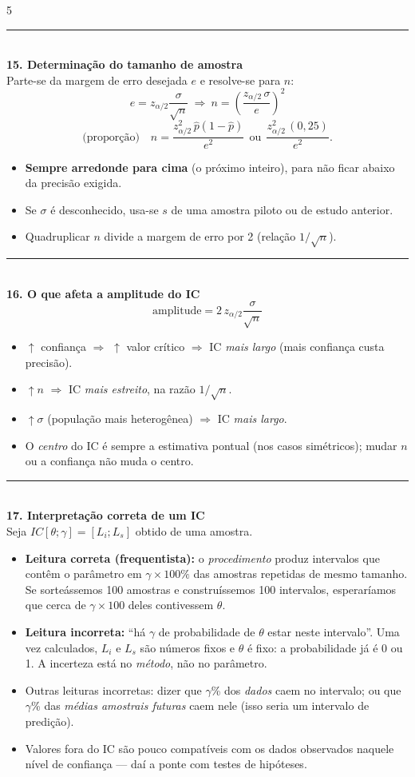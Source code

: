 \documentclass[a4paper,8pt]{extarticle}
\newcommand{\tit}[1]{\vspace{2pt}\textcolor{azul}{\rule{\linewidth}{0.6pt}}\\[1pt]\textbf{\textcolor{azul}{#1}}\\[1pt]}
\begin{document}
\begin{multicols*}{5}
\tit{15. Determinação do tamanho de amostra}
Parte-se da margem de erro desejada $e$ e resolve-se para $n$:
\[e=z_{\alpha/2}\frac{\sigma}{\sqrt n}\ \Longrightarrow\ n=\left(\frac{z_{\alpha/2}\,\sigma}{e}\right)^{2}\]
\[\text{(proporção)}\quad n=\frac{z_{\alpha/2}^2\,\hat p(1-\hat p)}{e^2}\ \ \text{ou}\ \ \frac{z_{\alpha/2}^2\,(0{,}25)}{e^2}.\]
\begin{itemize}
\item \textbf{Sempre arredonde para cima} (o próximo inteiro), para não ficar abaixo da precisão exigida.
\item Se $\sigma$ é desconhecido, usa-se $s$ de uma amostra piloto ou de estudo anterior.
\item Quadruplicar $n$ divide a margem de erro por 2 (relação $1/\sqrt n$).
\end{itemize}

\tit{16. O que afeta a amplitude do IC}
\[\text{amplitude}=2\,z_{\alpha/2}\frac{\sigma}{\sqrt n}\]
\begin{itemize}
\item $\uparrow$ confiança $\Rightarrow$ $\uparrow$ valor crítico $\Rightarrow$ IC \emph{mais largo} (mais confiança custa precisão).
\item $\uparrow n$ $\Rightarrow$ IC \emph{mais estreito}, na razão $1/\sqrt n$.
\item $\uparrow \sigma$ (população mais heterogênea) $\Rightarrow$ IC \emph{mais largo}.
\item O \emph{centro} do IC é sempre a estimativa pontual (nos casos simétricos); mudar $n$ ou a confiança não muda o centro.
\end{itemize}

\tit{17. Interpretação correta de um IC}
Seja $IC[\theta;\gamma]=[L_i;L_s]$ obtido de uma amostra.
\begin{itemize}
\item \textbf{Leitura correta (frequentista):} o \emph{procedimento} produz intervalos que contêm o parâmetro em $\gamma\times100\%$ das amostras repetidas de mesmo tamanho. Se sorteássemos 100 amostras e construíssemos 100 intervalos, esperaríamos que cerca de $\gamma\times100$ deles contivessem $\theta$.
\item \textbf{Leitura incorreta:} “há $\gamma$ de probabilidade de $\theta$ estar neste intervalo”. Uma vez calculados, $L_i$ e $L_s$ são números fixos e $\theta$ é fixo: a probabilidade já é 0 ou 1. A incerteza está no \emph{método}, não no parâmetro.
\item Outras leituras incorretas: dizer que $\gamma$\% dos \emph{dados} caem no intervalo; ou que $\gamma$\% das \emph{médias amostrais futuras} caem nele (isso seria um intervalo de predição).
\item Valores fora do IC são pouco compatíveis com os dados observados naquele nível de confiança — daí a ponte com testes de hipóteses.
\end{itemize}


\end{multicols*}
\end{document}
